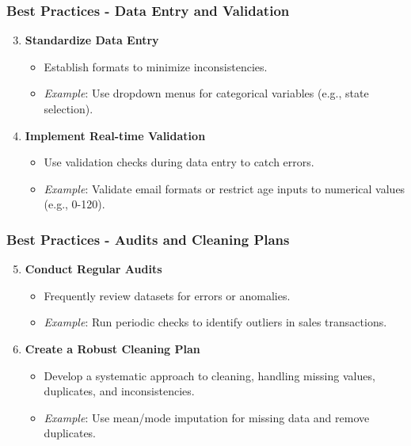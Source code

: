 \documentclass[aspectratio=169]{beamer}
\begin{document}
\begin{frame}[fragile]
    \frametitle{Best Practices - Data Entry and Validation}
    \begin{enumerate}
        \setcounter{enumi}{2}
        \item \textbf{Standardize Data Entry}
        \begin{itemize}
            \item Establish formats to minimize inconsistencies.
            \item \textit{Example}: Use dropdown menus for categorical variables (e.g., state selection).
        \end{itemize}

        \item \textbf{Implement Real-time Validation}
        \begin{itemize}
            \item Use validation checks during data entry to catch errors.
            \item \textit{Example}: Validate email formats or restrict age inputs to numerical values (e.g., 0-120).
        \end{itemize}
    \end{enumerate}
\end{frame}

\begin{frame}[fragile]
    \frametitle{Best Practices - Audits and Cleaning Plans}
    \begin{enumerate}
        \setcounter{enumi}{4}
        \item \textbf{Conduct Regular Audits}
        \begin{itemize}
            \item Frequently review datasets for errors or anomalies.
            \item \textit{Example}: Run periodic checks to identify outliers in sales transactions.
        \end{itemize}

        \item \textbf{Create a Robust Cleaning Plan}
        \begin{itemize}
            \item Develop a systematic approach to cleaning, handling missing values, duplicates, and inconsistencies.
            \item \textit{Example}: Use mean/mode imputation for missing data and remove duplicates.
        \end{itemize}
    \end{enumerate}
\end{frame}
\end{document}
